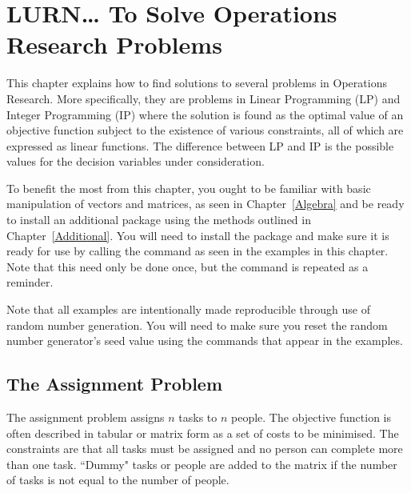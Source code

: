 

\chapter{LURN\ldots{} To Solve Operations Research Problems}
\label{OperRes}


This chapter explains how to find solutions to several problems in Operations Research. More specifically, they are problems in Linear Programming (LP) and Integer Programming (IP) where the solution is found as the optimal value of an objective function subject to the existence of various constraints, all of which are expressed as linear functions. The difference between LP and IP is the possible values for the decision variables under consideration.

To benefit the most from this chapter, you ought to be familiar with basic manipulation of vectors and matrices, as seen in Chapter~\ref{Algebra}  and be ready to install an additional package using the methods outlined in Chapter~\ref{Additional}. You will need to install the  package and make sure it is ready for use by calling the  command as seen in the examples in this chapter. Note that this need only be done once, but the command is repeated as a reminder.

Note that all examples are intentionally made reproducible through use of random number generation. You will need to make sure you reset the random number generator's seed value using the  commands that appear in the examples.


\section{The Assignment Problem}

The assignment problem assigns $n$ tasks to $n$ people. The objective function is often described in tabular or matrix form as a set of costs to be minimised. The constraints are that all tasks must be assigned and no person can complete more than one task. ``Dummy" tasks or people are added to the matrix if the number of tasks is not equal to the number of people. 

